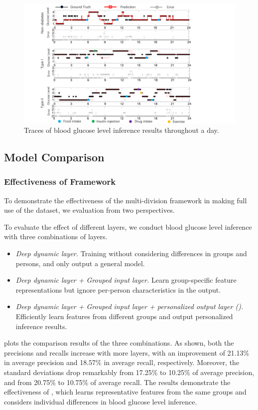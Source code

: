 
\begin{figure}[h]
  \centering
  \includegraphics[width=0.8\columnwidth]{./img/pred_vs_gt2.pdf}
  \caption{Traces of blood glucose level inference results throughout a day.}
  \label{fig:pre_gt}
\end{figure}

\subsection{Model Comparison}

\subsubsection{Effectiveness of \modelname Framework}
To demonstrate the effectiveness of the multi-division framework in making full use of the dataset, we evaluation \modelname from two perspectives.

To evaluate the effect of different layers, we conduct blood glucose level inference with three combinations of layers.
\begin{itemize}
  \item
  \emph{Deep dynamic layer.}
  Training without considering differences in groups and persons, and only output a general model.
  \item
  \emph{Deep dynamic layer + Grouped input layer.}
  Learn group-specific feature representations but ignore per-person characteristics in the output.
  \item
  \emph{Deep dynamic layer + Grouped input layer + personalized output layer (\modelname).}
  Efficiently learn features from different groups and output personalized inference results.
\end{itemize}
 plots the comparison results of the three combinations.
As shown, both the precisions and recalls increase with more layers, with an improvement of 21.13\% in average precision and 18.57\% in average recall, respectively.
Moreover, the standard deviations drop remarkably from 17.25\% to 10.25\%  of average precision, and from 20.75\% to 10.75\% of average recall.
The results demonstrate the effectiveness of \modelname, which learns representative features from the same groups and considers individual differences in blood glucose level inference.

